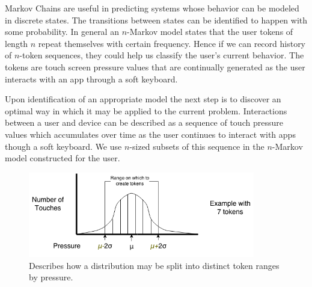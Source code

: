 \documentclass{acm_proc_article-sp}
\begin{document}
Markov Chains are useful in predicting systems whose behavior can be modeled in discrete states. The transitions between states can be identified to happen with some probability.
In general an $n$-Markov model states that the
user tokens of length $n$ repeat themselves with certain frequency. Hence if we can record history
of $n$-token sequences, they could help us classify the user's current behavior. The tokens are
touch screen pressure values that are continually generated as the user interacts with an app
through a soft keyboard.


Upon identification of an appropriate model the next step is to discover an optimal way in which it may be applied to the current problem. Interactions between a user and device can be described as a sequence of touch pressure values which accumulates over time
as the user continues to interact with apps though a soft keyboard.
We use $n$-sized subsets of this sequence in the $n$-Markov model constructed for the user.\cite{marcov_chains_previous_n_values}

\begin{figure}
\centering
\includegraphics[width=3.9in]{token_creation.png}
\caption{Describes how a distribution may be split into distinct token ranges by pressure.}
\label{fig:token_creation}
\end{figure}
\end{document}
